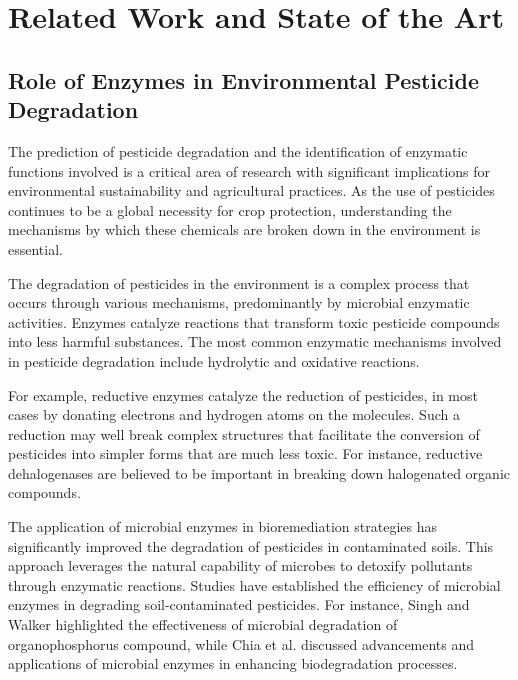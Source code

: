 \section{Related Work and State of the Art}

\subsection{Role of Enzymes in Environmental Pesticide Degradation}
\label{sec:Role of Enzymes in Environmental Pesticide Degradation}

The prediction of pesticide degradation and the identification of enzymatic functions involved is a critical area of research with significant implications for environmental sustainability and agricultural practices. As the use of pesticides continues to be a global necessity for crop protection, understanding the mechanisms by which these chemicals are broken down in the environment is essential.

The degradation of pesticides in the environment is a complex process that occurs through various mechanisms, predominantly by microbial enzymatic activities. Enzymes catalyze reactions that transform toxic pesticide compounds into less harmful substances. The most common enzymatic mechanisms involved in pesticide degradation include hydrolytic and oxidative reactions.

For example, reductive enzymes catalyze the reduction of pesticides, in most cases by donating electrons and hydrogen atoms on the molecules. Such a reduction may well break complex structures that facilitate the conversion of pesticides into simpler forms that are much less toxic. For instance, reductive dehalogenases are believed to be important in breaking down halogenated organic compounds.

The application of microbial enzymes in bioremediation strategies has significantly improved the degradation of pesticides in contaminated soils. This approach leverages the natural capability of microbes to detoxify pollutants through enzymatic reactions. Studies have established the efficiency of microbial enzymes in degrading soil-contaminated pesticides. For instance, Singh and Walker \autocite{singhMicrobialDegradationOrganophosphorus2006} highlighted the effectiveness of microbial degradation of organophosphorus compound, while Chia et al. \autocite{chiaFunctionMicrobialEnzymes2024} discussed advancements and applications of microbial enzymes in enhancing biodegradation processes.

